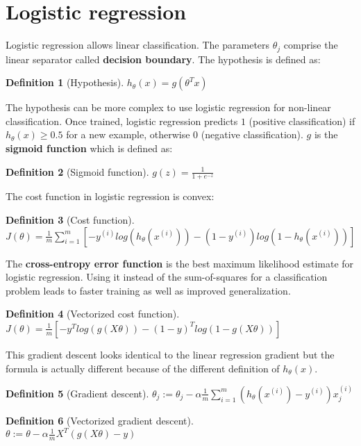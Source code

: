\documentclass{report}
\newtheorem{definition}{Definition}[section]
\begin{document}
\section{Logistic regression}

Logistic regression allows linear classification. The parameters $\theta_j$ comprise the linear separator called {\bf decision boundary}. The hypothesis is defined as:
\begin{definition}[Hypothesis]
$h_\theta(x) = g(\theta^{T}x)$
\end{definition}

The hypothesis can be more complex to use logistic regression for non-linear classification. Once trained, logistic regression predicts $1$ (positive classification) if $h_\theta(x) \ge 0.5$ for a new example, otherwise $0$ (negative classification). $g$ is the {\bf sigmoid function} which is defined as:
\begin{definition}[Sigmoid function]
$g(z) = \frac{1}{1 + e^{-z}}$
\end{definition}

The cost function in logistic regression is convex:
\begin{definition}[Cost function] ~\\
$J(\theta) = \frac{1}{m}\sum_{i=1}^m[-y^{(i)}log(h_{\theta}(x^{(i)}))-(1-y^{(i)})log(1-h_{\theta}(x^{(i)}))]$
\end{definition}

The {\bf cross-entropy error function} is the best maximum likelihood estimate for logistic regression.
Using it instead of the sum-of-squares for a classification problem leads to faster training as well as improved generalization.


\begin{definition}[Vectorized cost function] ~\\
$J(\theta) = \frac{1}{m}[-y^T log(g(X\theta))-(1-y)^T log(1-g(X\theta))]$
\end{definition}

This gradient descent looks identical to the linear regression gradient but the formula is actually different because of the different definition of $h_{\theta}(x)$.
\begin{definition}[Gradient descent]
$\theta_j := \theta_j - \alpha \frac{1}{m}\sum_{i=1}^m(h_\theta(x^{(i)})-y^{(i)})x_j^{(i)}$
\end{definition}

\begin{definition}[Vectorized gradient descent] ~\\
$\theta := \theta - \alpha \frac{1}{m}X^{T}(g(X\theta)-y)$
\end{definition}
\end{document}
